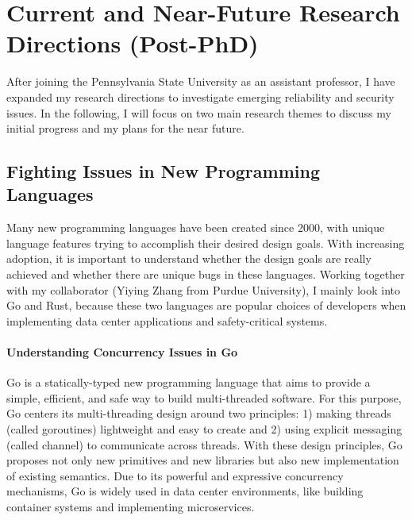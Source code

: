 \documentclass[10pt]{article}
\begin{document}
\vspace{-.1in}
\section{Current and Near-Future Research Directions (Post-PhD)}
After joining the Pennsylvania State University as an assistant professor,
I have expanded my research directions to investigate
emerging reliability and security issues.  
In the following, I will focus on two main research themes 
to discuss my initial progress and my plans for the near future. 

\vspace{-.1in}
\subsection{Fighting Issues in New Programming Languages}
Many new programming languages have been created since 2000, 
with unique language features trying to accomplish their desired design goals.
With increasing adoption, it is important to understand 
whether the design goals are really achieved 
and whether there are unique bugs in these languages. 
Working together with my collaborator (Yiying Zhang from Purdue University), 
I mainly look into Go and Rust, because 
these two languages are popular choices 
of developers when implementing 
data center applications and safety-critical systems. 
 
\vspace{-.1in}
\paragraph{Understanding Concurrency Issues in Go}
Go is a statically-typed new programming language that aims to provide 
a simple, efficient, and safe way to build multi-threaded software.
For this purpose, Go centers its multi-threading design 
around two principles: 1) making threads (called goroutines) lightweight 
and easy to create and 2) using explicit messaging (called channel) 
to communicate across threads. With these design principles, 
Go proposes not only new primitives and new libraries 
but also new implementation of existing semantics.
Due to its powerful and expressive concurrency mechanisms, 
Go is widely used in data center environments,
like building container systems and implementing microservices.
\end{document}
